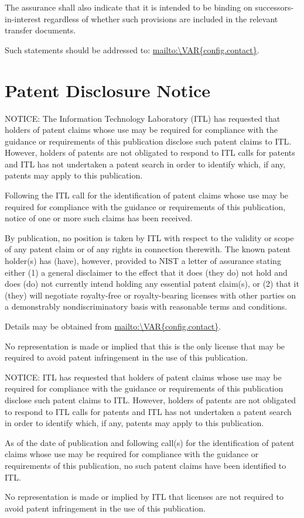 The assurance shall also indicate that it is intended to be binding on successors-in-interest regardless of whether such provisions are included in the relevant transfer documents.

Such statements should be addressed to: \url{mailto:\VAR{config.contact}}.


\section*{Patent Disclosure Notice}


NOTICE: The Information Technology Laboratory (ITL) has requested that holders of patent claims whose use may be required for compliance with the guidance or requirements of this publication disclose such patent claims to ITL. However, holders of patents are not obligated to respond to ITL calls for patents and ITL has not undertaken a patent search in order to identify which, if any, patents may apply to this publication. 

Following the ITL call for the identification of patent claims whose use may be required for compliance with the guidance or requirements of this publication, notice of one or more such claims has been received. 

By publication, no position is taken by ITL with respect to the validity or scope of any patent claim or of any rights in connection therewith. The known patent holder(s) has (have), however, provided to NIST a letter of assurance stating either (1) a general disclaimer to the effect that it does (they do) not hold and does (do) not currently intend holding any essential patent claim(s), or (2) that it (they) will negotiate royalty-free or royalty-bearing licenses with other parties on a demonstrably nondiscriminatory basis with reasonable terms and conditions. 

Details may be obtained from \url{mailto:\VAR{config.contact}}.

No representation is made or implied that this is the only license that may be required to avoid patent infringement in the use of this publication. 


NOTICE: ITL has requested that holders of patent claims whose use may be required for compliance with the guidance or requirements of this publication disclose such patent claims to ITL. However, holders of patents are not obligated to respond to ITL calls for patents and ITL has not undertaken a patent search in order to identify which, if any, patents may apply to this publication.

As of the date of publication and following call(s) for the identification of patent claims whose use may be required for compliance with the guidance or requirements of this publication, no such patent claims have been identified to ITL.

No representation is made or implied by ITL that licenses are not required to avoid patent infringement in the use of this publication.


